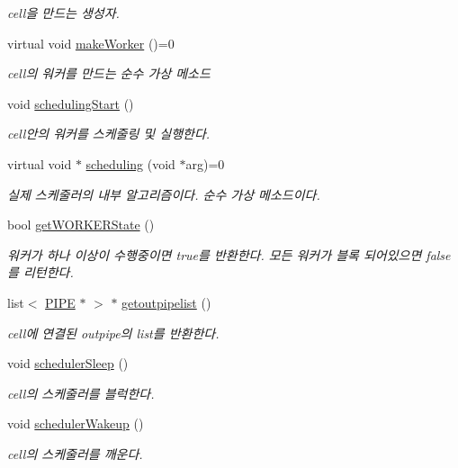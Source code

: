 \begin{DoxyCompactItemize}
\begin{DoxyCompactList}\small\item\em cell을 만드는 생성자. \end{DoxyCompactList}\item 
virtual void \hyperlink{classCELL_a1b048e8ac8cc57bcdff18bbcba6ed975}{make\+Worker} ()=0
\begin{DoxyCompactList}\small\item\em cell의 워커를 만드는 순수 가상 메소드 \end{DoxyCompactList}\item 
void \hyperlink{classCELL_a99661b458e7c235892c9bcd3414f1403}{scheduling\+Start} ()
\begin{DoxyCompactList}\small\item\em cell안의 워커를 스케줄링 및 실행한다. \end{DoxyCompactList}\item 
virtual void $\ast$ \hyperlink{classCELL_adcd2e66700a2c6f0cb234cbe63d2e10c}{scheduling} (void $\ast$arg)=0
\begin{DoxyCompactList}\small\item\em 실제 스케줄러의 내부 알고리즘이다. 순수 가상 메소드이다. \end{DoxyCompactList}\item 
bool \hyperlink{classCELL_a768550329a49aa05ca98f31ab859aac4}{get\+W\+O\+R\+K\+E\+R\+State} ()
\begin{DoxyCompactList}\small\item\em 워커가 하나 이상이 수행중이면 true를 반환한다. 모든 워커가 블록 되어있으면 false를 리턴한다. \end{DoxyCompactList}\item 
list$<$ \hyperlink{classPIPE}{P\+I\+P\+E} $\ast$ $>$ $\ast$ \hyperlink{classCELL_ae9f289599c3fee2e1789b81ff72742e8}{getoutpipelist} ()
\begin{DoxyCompactList}\small\item\em cell에 연결된 outpipe의 list를 반환한다. \end{DoxyCompactList}\item 
void \hyperlink{classCELL_ac9f06814e46403e615afd0a7c43d26f9}{scheduler\+Sleep} ()
\begin{DoxyCompactList}\small\item\em cell의 스케줄러를 블럭한다. \end{DoxyCompactList}\item 
void \hyperlink{classCELL_a70bb6d324838362f2feeb4ba47accc4e}{scheduler\+Wakeup} ()
\begin{DoxyCompactList}\small\item\em cell의 스케줄러를 깨운다. \end{DoxyCompactList}\item 

\end{DoxyCompactItemize}
